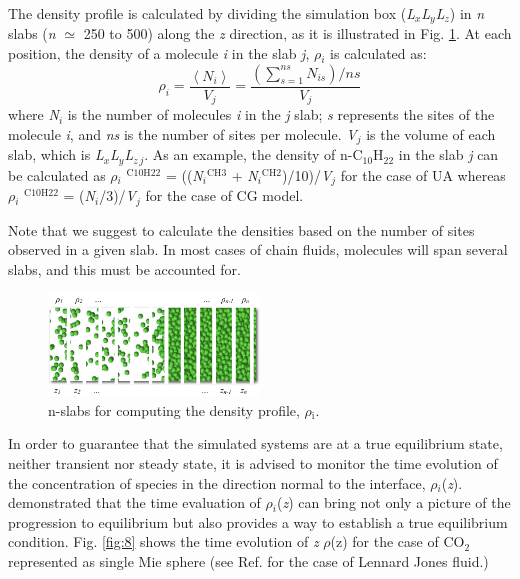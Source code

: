 \documentclass[9pt,bestpractices]{livecoms}
\begin{document}
The density profile is calculated by dividing the simulation box
(\textit{L}$_{x}$\textit{L}$_{y}$\textit{L}$_{z}$) in \textit{n} slabs
(\textit{n} ${\simeq}$ 250 to 500) along the \textit{z} direction, as it is
illustrated in Fig. \ref{fig:7}. At each position, the density of a molecule
\textit{i} in the slab \textit{j}, {${\rho}$}$_{i}$  is calculated as:
\begin{equation}
\rho_{i}=\frac{\left\langle N_{i}\right\rangle }{V_{j}}=\frac{\left(\sum_{s=1}^{ns}N_{is}\right)/ns}{V_{j}}
\end{equation}
where \textit{N}$_{i}$ is the number of molecules \textit{i} in the \textit{j}
slab; \textit{s} represents the sites of the molecule \textit{i}, and
\textit{ns} is the number of sites per molecule. \textit{V}$_{j}$ is the volume of each
slab, which is \textit{L}$_{x}$\textit{L}$_{y}$\textit{L}$_{z\,j}$. As an
example, the density of n-C$_{10}$H$_{22}$ in the slab \textit{j} can be
calculated as {${\rho}$}$_{i}$ $^{\mathrm{C10H22}}$
= ((\textit{N}$_{i}$$^{\mathrm{CH3}}$
+ \textit{N}$_{i}$$^{\mathrm{CH2}}$)/10)/\textit{V}$_{j}$ for the case of UA
whereas {${\rho}$}$_{i}$ $^{\mathrm{C10H22}}$
= (\textit{N}$_{i}$/3)/\textit{V}$_{j}$ for the case of CG model.
\begin{mdframed}[backgroundcolor=orange!20]
Note that we suggest to calculate the densities based on the number of sites observed
in a given slab. In most cases of chain fluids, molecules will span several slabs,
and this must be accounted for.
\end{mdframed}

\begin{figure}
\includegraphics[width=0.5\textwidth]{gfx/image51.png}
\caption{n-slabs for computing the density profile, ${\rho}$$_{\mathrm{i}}$.}
\label{fig:7}
\end{figure}

In order to guarantee that the simulated systems are at a true equilibrium
state, neither transient nor steady state, it is advised to monitor the time
evolution of the concentration of species in the direction normal to the
interface, {${\rho}$}$_{i}$(\textit{z}). \citet{holcomb1993} demonstrated that the time evaluation of
{${\rho}$}$_{i}$(\textit{z}) can bring not only a picture of the progression to
equilibrium but also provides a way to establish a true equilibrium condition.
Fig. \ref{fig:8} shows the time evolution of \textit{z} \textendash{} {${\rho}$}(z)
for the case of CO$_{2}$ represented as single Mie sphere (see Ref. \citep{mejia2005} for the case of
Lennard \textendash{} Jones fluid.) 
\end{document}

